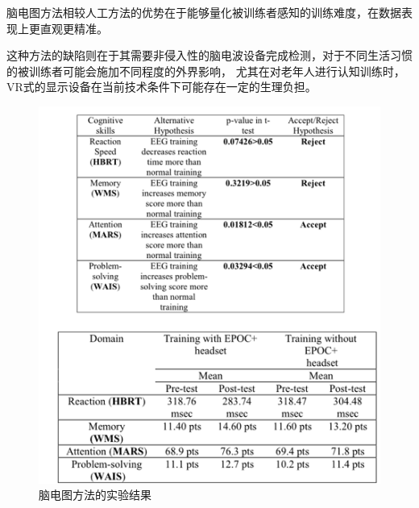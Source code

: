 \documentclass{article}
\begin{document}
            脑电图方法相较人工方法的优势在于能够量化被训练者感知的训练难度，在数据表现上更直观更精准。

            这种方法的缺陷则在于其需要非侵入性的脑电波设备完成检测，对于不同生活习惯的被训练者可能会施加不同程度的外界影响，
            尤其在对老年人进行认知训练时，VR式的显示设备在当前技术条件下可能存在一定的生理负担。
            \begin{figure}[H]
            	\centering
            	\includegraphics[scale=0.8]{images/brain_data.png}
            	\caption{脑电图方法的实验结果}
            	\label{fig:label}
            \end{figure}
\end{document}
